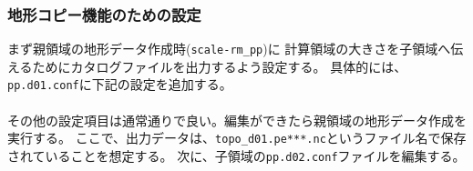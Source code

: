 \subsubsection{地形コピー機能のための設定}

まず親領域の地形データ作成時(\verb|scale-rm_pp|)に
計算領域の大きさを子領域へ伝えるためにカタログファイルを出力するよう設定する。
具体的には、\verb|pp.d01.conf|に下記の設定を追加する。\\

\\

\noindent その他の設定項目は通常通りで良い。編集ができたら親領域の地形データ作成を実行する。
ここで、出力データは、\verb|topo_d01.pe***.nc|というファイル名で保存されていることを想定する。
次に、子領域の\verb|pp.d02.conf|ファイルを編集する。\\

